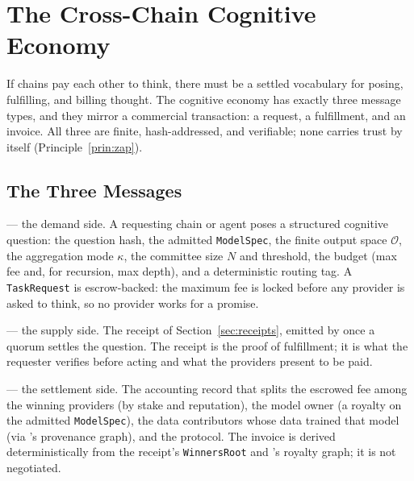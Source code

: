 \section{The Cross-Chain Cognitive Economy}
\label{sec:economy}

If chains pay each other to think, there must be a settled vocabulary for posing, fulfilling, and billing thought. The cognitive economy has exactly three message types, and they mirror a commercial transaction: a request, a fulfillment, and an invoice. All three are finite, hash-addressed, and verifiable; none carries trust by itself (Principle~\ref{prin:zap}).

\subsection{The Three Messages}

\begin{description}[style=nextline,leftmargin=0pt]
\item[\textnormal{\texttt{TaskRequest}}] --- the demand side. A requesting chain or agent poses a structured cognitive question: the question hash, the admitted \texttt{ModelSpec}, the finite output space $\mathcal{O}$, the aggregation mode $\kappa$, the committee size $N$ and threshold, the budget (max fee and, for recursion, max depth), and a deterministic routing tag. A \texttt{TaskRequest} is escrow-backed: the maximum fee is locked before any provider is asked to think, so no provider works for a promise.

\item[\textnormal{\texttt{Receipt}}] --- the supply side. The \PoT{} receipt of Section~\ref{sec:receipts}, emitted by \AChain{} once a quorum settles the question. The receipt is the proof of fulfillment; it is what the requester verifies before acting and what the providers present to be paid.

\item[\textnormal{\texttt{Invoice}}] --- the settlement side. The accounting record that splits the escrowed fee among the winning providers (by stake and reputation), the model owner (a royalty on the admitted \texttt{ModelSpec}), the data contributors whose data trained that model (via \DChain{}'s provenance graph), and the protocol. The invoice is derived deterministically from the receipt's \texttt{WinnersRoot} and \DChain{}'s royalty graph; it is not negotiated.
\end{description}

